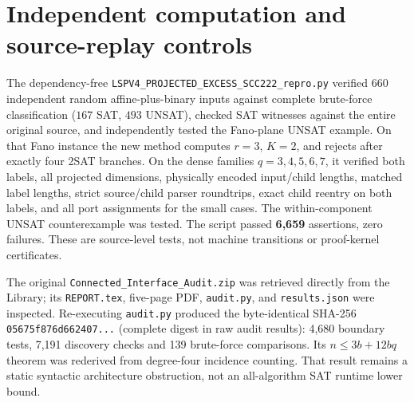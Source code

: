 \documentclass[11pt]{article}
\begin{document}
\section{Independent computation and source-replay controls}
The dependency-free \texttt{LSPV4\_PROJECTED\_EXCESS\_SCC222\_repro.py} verified 660 independent random affine-plus-binary inputs against complete brute-force classification ($167$ SAT, $493$ UNSAT), checked SAT witnesses against the entire original source, and independently tested the Fano-plane UNSAT example. On that Fano instance the new method computes $r=3$, $K=2$, and rejects after exactly four 2SAT branches. On the dense families $q=3,4,5,6,7$, it verified both labels, all projected dimensions, physically encoded input/child lengths, matched label lengths, strict source/child parser roundtrips, exact child reentry on both labels, and all port assignments for the small cases. The within-component UNSAT counterexample was tested. The script passed \textbf{6,659} assertions, zero failures. These are source-level tests, not machine transitions or proof-kernel certificates.

The original \texttt{Connected\_Interface\_Audit.zip} was retrieved directly from the Library; its \texttt{REPORT.tex}, five-page PDF, \texttt{audit.py}, and \texttt{results.json} were inspected. Re-executing \texttt{audit.py} produced the byte-identical SHA-256 \texttt{05675f876d662407...} (complete digest in raw audit results): 4,680 boundary tests, 7,191 discovery checks and 139 brute-force comparisons. Its $n\le3b+12bq$ theorem was rederived from degree-four incidence counting. That result remains a static syntactic architecture obstruction, not an all-algorithm SAT runtime lower bound.
\end{document}
